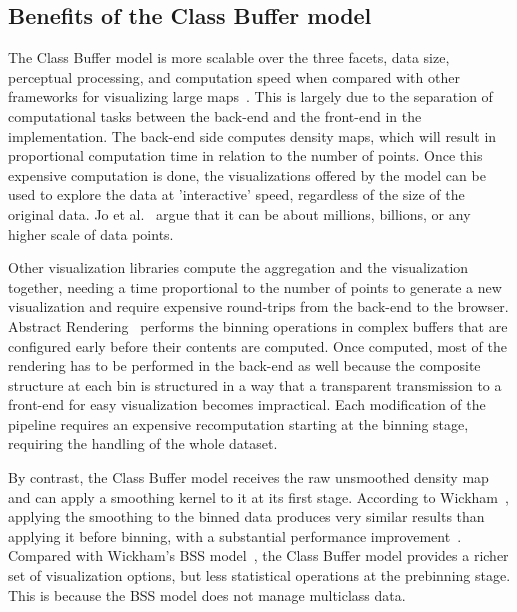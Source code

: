 \subsection{Benefits of the Class Buffer model}
The Class Buffer model is more scalable over the three facets, data size, perceptual processing, and computation speed when compared with other frameworks for visualizing large maps~\cite{jo2019declarative}. This is largely due to the separation of computational tasks between the back-end and the front-end in the implementation.
The back-end side computes density maps, which will result in proportional computation time in relation to the number of points.
Once this expensive computation is done, the visualizations offered by the model can be used to explore the data at 'interactive' speed, regardless of the size of the original data.
Jo et al.~\cite{jo2019declarative} argue that it can be about millions, billions, or any higher scale of data points.

Other visualization libraries compute the aggregation and the visualization together, needing a time proportional to the number of points to generate a new visualization and require expensive round-trips from the back-end to the browser. Abstract Rendering~\cite{cottam2013overplotting, cottam2014abstract} performs the binning operations in complex buffers that are configured early before their contents are computed.
Once computed, most of the rendering has to be performed in the back-end as well because the composite structure at each bin is structured in a way that a transparent transmission to a front-end for easy visualization becomes impractical. Each modification of the pipeline requires an expensive recomputation starting at the binning stage, requiring the handling of the whole dataset.

By contrast, the Class Buffer model receives the raw unsmoothed density map and can apply a smoothing kernel to it at its first stage. According to Wickham~\cite{wickham2013bin}, applying the smoothing to the binned data produces very similar results than applying it before binning, with a substantial performance improvement~\cite{wand1994fast}. Compared with Wickham’s BSS model~\cite{wickham2013bin}, the Class Buffer model provides a richer set of visualization options, but less statistical operations at the prebinning stage. This is because the BSS model does not manage multiclass data.


